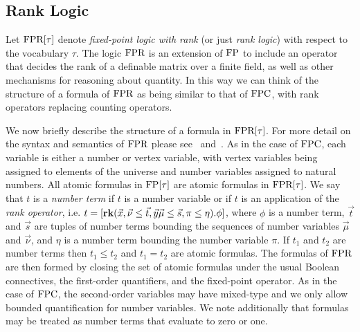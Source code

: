 \documentclass[../paper.tex]{subfiles}
\begin{document}

\subsection{Rank Logic}
Let $\text{\upshape FPR}[\tau]$ denote \emph{fixed-point logic with rank} (or just \emph{rank
  logic}) with respect to the vocabulary $\tau$. The logic $\text{\upshape FPR}$ is an
extension of $\text{\upshape FP}$ to include an operator that decides the rank of a definable
matrix over a finite field, as well as other mechanisms for reasoning about
quantity. In this way we can think of the structure of a formula of $\text{\upshape FPR}$ as
being similar to that of $\text{\upshape FPC}$, with rank operators replacing counting
operators.

We now briefly describe the structure of a formula in $\text{\upshape FPR}[\tau]$. For more
detail on the syntax and semantics of $\text{\upshape FPR}$ please see~\cite{GradelP15a}
and~\cite{Dawar09logicswith}. As in the case of $\text{\upshape FPC}$, each variable is either
a number or vertex variable, with vertex variables being assigned to elements of
the universe and number variables assigned to natural numbers. All atomic
formulas in $\text{\upshape FP}[\tau]$ are atomic formulas in $\text{\upshape FPR}[\tau]$. We say that $t$ is
a \emph{number term} if $t$ is a number variable or if $t$ is an application of
the \emph{rank operator}, i.e. $t = [\text{\textbf{rk}} (\vec{x}, \vec {\nu} \leq \vec{t},
\vec{y}\vec{\mu} \leq \vec{s}, \pi \leq \eta). \phi]$, where $\phi$ is a number
term, $\vec{t}$ and $\vec{s}$ are tuples of number terms bounding the sequences
of number variables $\vec{\mu}$ and $\vec{\nu}$, and $\eta$ is a number term
bounding the number variable $\pi$. If $t_1$ and $t_2$ are number terms then
$t_1 \leq t_2$ and $t_1 = t_2$ are atomic formulas. The formulas of $\text{\upshape FPR}$ are
then formed by closing the set of atomic formulas under the usual Boolean
connectives, the first-order quantifiers, and the fixed-point operator. As in
the case of $\text{\upshape FPC}$, the second-order variables may have mixed-type and we only
allow bounded quantification for number variables. We note additionally that
formulas may be treated as number terms that evaluate to zero or one.
\end{document}
